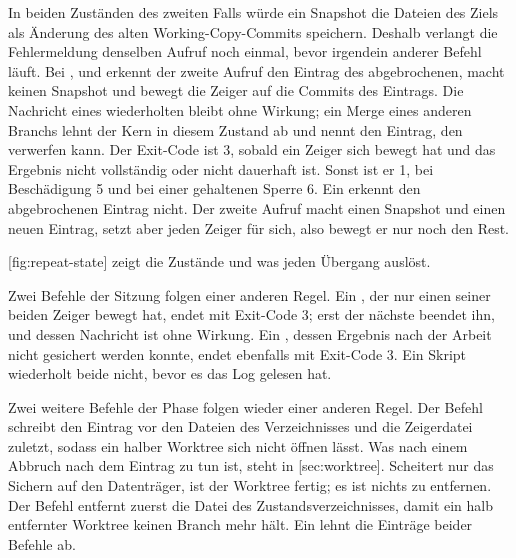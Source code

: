 In beiden Zuständen des zweiten Falls würde ein Snapshot die Dateien des Ziels als Änderung des
alten Working-Copy-Commits speichern.
Deshalb verlangt die Fehlermeldung denselben Aufruf noch einmal, bevor irgendein anderer Befehl
läuft.
Bei ,  und  erkennt der zweite Aufruf den Eintrag des
abgebrochenen, macht keinen Snapshot und bewegt die Zeiger auf die Commits des Eintrags.
Die Nachricht eines wiederholten  bleibt ohne Wirkung; ein Merge eines anderen Branchs
lehnt der Kern in diesem Zustand ab und nennt den Eintrag, den  verwerfen kann.
Der Exit-Code ist 3, sobald ein Zeiger sich bewegt hat und das Ergebnis nicht vollständig oder
nicht dauerhaft ist.
Sonst ist er 1, bei Beschädigung 5 und bei einer gehaltenen Sperre 6.
Ein  erkennt den abgebrochenen Eintrag nicht.
Der zweite Aufruf macht einen Snapshot und einen neuen Eintrag, setzt aber jeden Zeiger für sich,
also bewegt er nur noch den Rest.

[fig:repeat-state] zeigt die Zustände und was jeden Übergang auslöst.

\startplacefigure[title={Abbruch und Wiederholung: die Zustände von \type{switch},
    \type{merge}, \type{rebase} und dem Umschreiben},
    reference=fig:repeat-state,location=here]
\stopplacefigure

Zwei Befehle der Sitzung folgen einer anderen Regel.
Ein , der nur einen seiner beiden Zeiger bewegt hat, endet mit Exit-Code 3; erst der
nächste  beendet ihn, und dessen Nachricht ist ohne Wirkung.
Ein , dessen Ergebnis nach der Arbeit nicht gesichert werden konnte, endet ebenfalls
mit Exit-Code 3.
Ein Skript wiederholt beide nicht, bevor es das Log gelesen hat.

Zwei weitere Befehle der Phase folgen wieder einer anderen Regel.
Der Befehl  schreibt den Eintrag vor den Dateien des Verzeichnisses und die
Zeigerdatei  zuletzt, sodass ein halber Worktree sich nicht öffnen lässt.
Was nach einem Abbruch nach dem Eintrag zu tun ist, steht in [sec:worktree].
Scheitert nur das Sichern auf den Datenträger, ist der Worktree fertig;
es ist nichts zu entfernen.
Der Befehl  entfernt zuerst die Datei  des Zustandsverzeichnisses,
damit ein halb entfernter Worktree keinen Branch mehr hält.
Ein  lehnt die Einträge beider Befehle ab.

